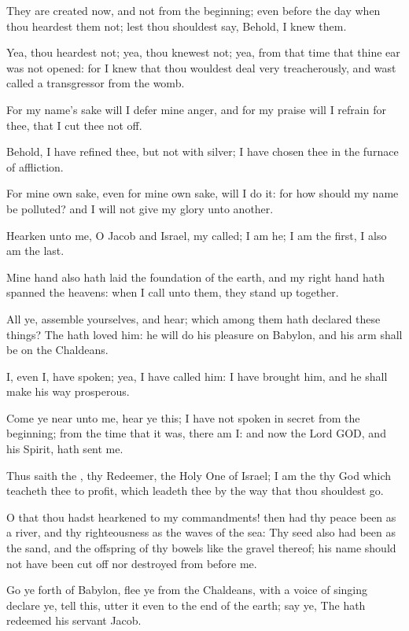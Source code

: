 \Verse They are created now, and not from the beginning; even before the day when thou heardest them not; lest thou shouldest say, Behold, I knew them.

\Verse Yea, thou heardest not; yea, thou knewest not; yea, from that time that thine ear was not opened: for I knew that thou wouldest deal very treacherously, and wast called a transgressor from the womb.

\Verse For my name's sake will I defer mine anger, and for my praise will I refrain for thee, that I cut thee not off.

\Verse Behold, I have refined thee, but not with silver; I have chosen thee in the furnace of affliction.

\Verse For mine own sake, even for mine own sake, will I do it: for how should my name be polluted? and I will not give my glory unto another.

\Verse Hearken unto me, O Jacob and Israel, my called; I am he; I am the first, I also am the last.

\Verse Mine hand also hath laid the foundation of the earth, and my right hand hath spanned the heavens: when I call unto them, they stand up together.

\Verse All ye, assemble yourselves, and hear; which among them hath declared these things? The \LORD hath loved him: he will do his pleasure on Babylon, and his arm shall be on the Chaldeans.

\Verse I, even I, have spoken; yea, I have called him: I have brought him, and he shall make his way prosperous.

\Verse Come ye near unto me, hear ye this; I have not spoken in secret from the beginning; from the time that it was, there am I: and now the Lord GOD, and his Spirit, hath sent me.

\Verse Thus saith the \LORD, thy Redeemer, the Holy One of Israel; I am the \LORD thy God which teacheth thee to profit, which leadeth thee by the way that thou shouldest go.

\Verse O that thou hadst hearkened to my commandments! then had thy peace been as a river, and thy righteousness as the waves of the sea: \Verse Thy seed also had been as the sand, and the offspring of thy bowels like the gravel thereof; his name should not have been cut off nor destroyed from before me.

\Verse Go ye forth of Babylon, flee ye from the Chaldeans, with a voice of singing declare ye, tell this, utter it even to the end of the earth; say ye, The \LORD hath redeemed his servant Jacob.

